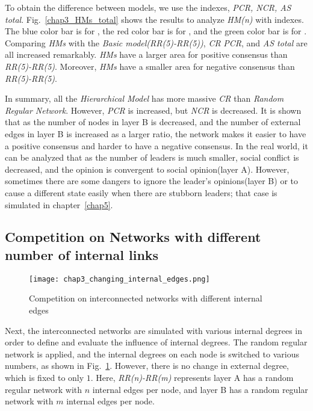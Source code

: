 To obtain the difference between models, we use the indexes, \textit{PCR, NCR, AS total}. Fig.~\ref{chap3_HMs_total} shows the results to analyze \textit{HM(n)} with indexes. The blue color bar is for , the red color bar is for , and the green color bar is for . Comparing \textit{HMs} with the \textit{Basic model(RR(5)-RR(5))}, \textit{CR} \textit{PCR}, and \textit{AS total} are all increased remarkably. \textit{HMs} have a larger area for positive consensus than \textit{RR(5)-RR(5)}. Moreover, \textit{HMs} have a smaller area for negative consensus than \textit{RR(5)-RR(5)}. 

In summary, all the \textit{Hierarchical Model} has more massive \textit{CR} than \textit{Random Regular Network}. However, \textit{PCR} is increased, but \textit{NCR} is decreased. It is shown that as the number of nodes in layer B is decreased, and the number of external edges in layer B is increased as a larger ratio, the network makes it easier to have a positive consensus and harder to have a negative consensus. In the real world, it can be analyzed that as the number of leaders is much smaller, social conflict is decreased, and the opinion is convergent to social opinion(layer A). However, sometimes there are some dangers to ignore the leader's opinions(layer B) or to cause a different state easily when there are stubborn leaders; that case is simulated in chapter~\ref{chap5}. \\

\subsection{Competition on Networks with different number of internal links}

\begin{figure}[!htb]
	\centering
	\texttt{[image: chap3\_changing\_internal\_edges.png]}
	\caption{Competition on interconnected networks with different internal edges}
	\label{chap3_changing_internal_edges}
\end{figure}

Next, the interconnected networks are simulated with various internal degrees in order to define and evaluate the influence of internal degrees. The random regular network is applied, and the internal degrees on each node is switched to various numbers, as shown in Fig.~\ref{chap3_changing_internal_edges}. However, there is no change in external degree, which is fixed to only $1$. Here, \textit{RR(n)-RR(m)} represents layer A has a random regular network with $n$ internal edges per node, and layer B has a random regular network with $m$ internal edges per node.

